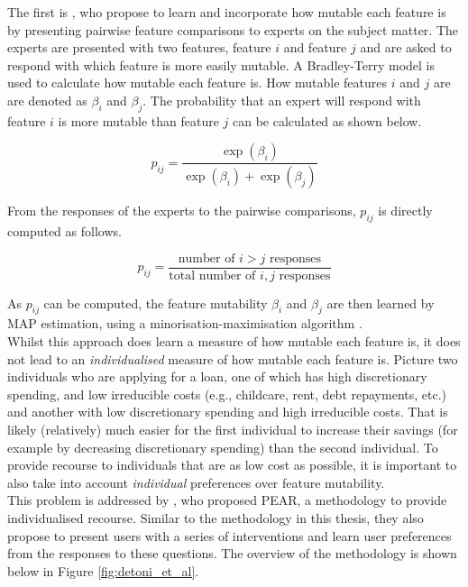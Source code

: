 The first is \textcite{rawalIndividualizedRecourseInterpretable2020}, who propose to learn and incorporate how mutable each feature is by presenting pairwise feature comparisons to experts on the subject matter. The experts are presented with two features, feature $i$ and feature $j$ and are asked to respond with which feature is more easily mutable. A Bradley-Terry model is used to calculate how mutable each feature is. How mutable features $i$ and $j$ are are denoted as $\beta_i$ and $\beta_j$. The probability that an expert will respond with feature $i$ is more mutable than feature $j$ can be calculated as shown below.

\begin{equation}
	p_{ij} = \frac{\exp(\beta_i)}{\exp(\beta_i) + \exp(\beta_j)}
\end{equation}

From the responses of the experts to the pairwise comparisons, $p_{ij}$ is directly computed as follows. 

\begin{equation}
	p_{ij} = \frac{\text{number of } i>j \text{ responses}}{\text{total number of } i, j \text{ responses}}
\end{equation}

As $p_{ij}$ can be computed, the feature mutability $\beta_i$ and $\beta_j$ are then learned by MAP estimation, using a minorisation-maximisation algorithm \citep{caronEfficientBayesianInference2012}.\\

Whilst this approach does learn a measure of how mutable each feature is, it does not lead to an \textit{individualised} measure of how mutable each feature is. Picture two individuals who are applying for a loan, one of which has high discretionary spending, and low irreducible costs (e.g., childcare, rent, debt repayments, etc.) and another with low discretionary spending and high irreducible costs. That is likely (relatively) much easier for the first individual to increase their savings (for example by decreasing discretionary spending) than the second individual. To provide recourse to individuals that are as low cost as possible, it is important to also take into account \textit{individual} preferences over feature mutability.\\


This problem is addressed by \textcite{detoniPersonalizedAlgorithmicRecourse2023}, who proposed PEAR, a methodology to provide individualised recourse. Similar to the methodology in this thesis, they also propose to present users with a series of interventions and learn user preferences from the responses to these questions. The overview of the methodology is shown below in Figure \ref{fig:detoni_et_al}.\\


